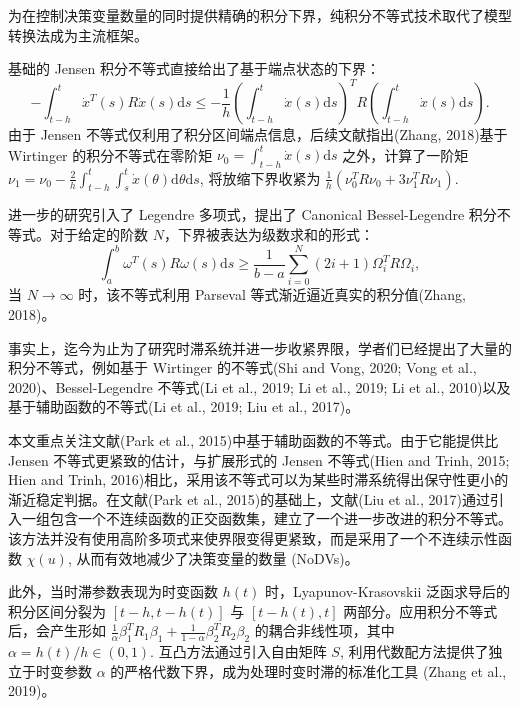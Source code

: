 \documentclass[a4paper, 12pt, oneside]{article}
\theoremstyle{cn_theorem}
\begin{document}
为在控制决策变量数量的同时提供精确的积分下界，纯积分不等式技术取代了模型转换法成为主流框架。

基础的 Jensen 积分不等式直接给出了基于端点状态的下界：
\begin{equation*}
    -\int_{t-h}^t \dot{x}^T(s) R \dot{x}(s) \mathrm{d}s \le -\frac{1}{h} \left( \int_{t-h}^t \dot{x}(s) \mathrm{d}s \right)^T R \left( \int_{t-h}^t \dot{x}(s) \mathrm{d}s \right).
\end{equation*}
由于 Jensen 不等式仅利用了积分区间端点信息，后续文献指出(Zhang, 2018)基于 Wirtinger 的积分不等式在零阶矩 $\nu_0 = \int_{t-h}^t \dot{x}(s)\mathrm{d}s$ 之外，计算了一阶矩 $\nu_1 = \nu_0 - \frac{2}{h}\int_{t-h}^t \int_s^t \dot{x}(\theta)\mathrm{d}\theta \mathrm{d}s$, 将放缩下界收紧为 $\frac{1}{h} ( \nu_0^T R \nu_0 + 3 \nu_1^T R \nu_1 )$.

进一步的研究引入了 Legendre 多项式，提出了 Canonical Bessel-Legendre 积分不等式。对于给定的阶数 $N$，下界被表达为级数求和的形式：
\begin{equation*}
    \int_a^b \omega^T(s) R \omega(s) \mathrm{d}s \ge \frac{1}{b-a} \sum_{i=0}^N (2i+1) \Omega_i^T R \Omega_i,
\end{equation*}
当 $N \to \infty$ 时，该不等式利用 Parseval 等式渐近逼近真实的积分值(Zhang, 2018)。

事实上，迄今为止为了研究时滞系统并进一步收紧界限，学者们已经提出了大量的积分不等式，例如基于 Wirtinger 的不等式(Shi and Vong, 2020; Vong et al., 2020)、Bessel-Legendre 不等式(Li et al., 2019; Li et al., 2019; Li et al., 2010)以及基于辅助函数的不等式(Li et al., 2019; Liu et al., 2017)。

本文重点关注文献(Park et al., 2015)中基于辅助函数的不等式。由于它能提供比 Jensen 不等式更紧致的估计，与扩展形式的 Jensen 不等式(Hien and Trinh, 2015; Hien and Trinh, 2016)相比，采用该不等式可以为某些时滞系统得出保守性更小的渐近稳定判据。在文献(Park et al., 2015)的基础上，文献(Liu et al., 2017)通过引入一组包含一个不连续函数的正交函数集，建立了一个进一步改进的积分不等式。该方法并没有使用高阶多项式来使界限变得更紧致，而是采用了一个不连续示性函数 $\chi(u)$, 从而有效地减少了决策变量的数量 (NoDVs)。

此外，当时滞参数表现为时变函数 $h(t)$ 时，Lyapunov-Krasovskii 泛函求导后的积分区间分裂为 $[t-h, t-h(t)]$ 与 $[t-h(t), t]$ 两部分。应用积分不等式后，会产生形如 $\frac{1}{\alpha} \beta_1^T R_1 \beta_1 + \frac{1}{1-\alpha} \beta_2^T R_2 \beta_2$ 的耦合非线性项，其中 $\alpha = h(t)/h \in (0, 1)$. 互凸方法通过引入自由矩阵 $S$, 利用代数配方法提供了独立于时变参数 $\alpha$ 的严格代数下界，成为处理时变时滞的标准化工具 (Zhang et al., 2019)。
\end{document}
